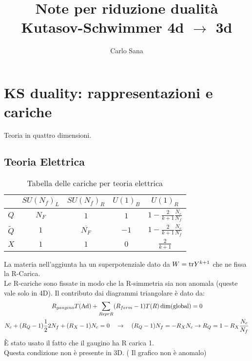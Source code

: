 \documentclass[a4paper,12pt]{article}
\title{Note per riduzione dualità Kutasov-Schwimmer 4d $\rightarrow$ 3d}
\author{Carlo Sana}
\begin{document}
\maketitle
\newpage
\section*{KS duality: rappresentazioni e cariche}
Teoria in quattro dimensioni.
\subsection*{Teoria Elettrica}
\begin{center}
\begin{table}[h!]
\begin{tabular}{c c c c c }
 & $SU(N_f)_L$  &$SU(N_f)_R $  & $U(1)_B$ &  $U(1)_R$ \\
\hline
$Q$ & $N_F$ & $1$   &  $1$  & $ 1 - \frac{2}{k+1} \frac{N_c}{N_f}$  \\
$\tilde{Q}$  &  $1$ & $\overline{ N_F}$   & $-1$   &  $ 1 - \frac{2}{k+1} \frac{N_c}{N_f} $   \\
$X$ & $1$   &$ 1$    &$ 0$   &  $\frac{2}{k+1}$ \\
\end{tabular}
\centering
\caption{Tabella delle cariche per teoria elettrica}
\label{table:charge_table_el_ks_4d}
\end{table}
\end{center}
La materia nell'aggiunta ha un superpotenziale dato da $ W = \hbox{tr} Y^{k+1}$ che ne fissa la R-Carica.\\
Le R-cariche sono fissate in modo che la R-simmetria sia non anomala (queste vale solo in 4D).
Il contributo dai diagrammi triangolare è dato da:
\begin{align*}
R_{gaugino} T (\hbox{Ad}) + \sum_{Repr R} (& R_{ferm} - 1)  T(R) \, \hbox{dim}( \hbox{global})  = 0 \\
N_c + (R_Q -1) \frac{1}{2} 2 N_f + (R_X - 1 ) N_c = 0 \quad & \rightarrow \quad (R_Q - 1 ) N_f = - R_X N_c \rightarrow R_Q = 1 - R_X \frac{N_c}{N_f} 
\end{align*}
È stato usato il fatto che il gaugino ha R carica 1. \\
Questa condizione non è presente in 3D. ( Il grafico non è anomalo)
\end{document}
